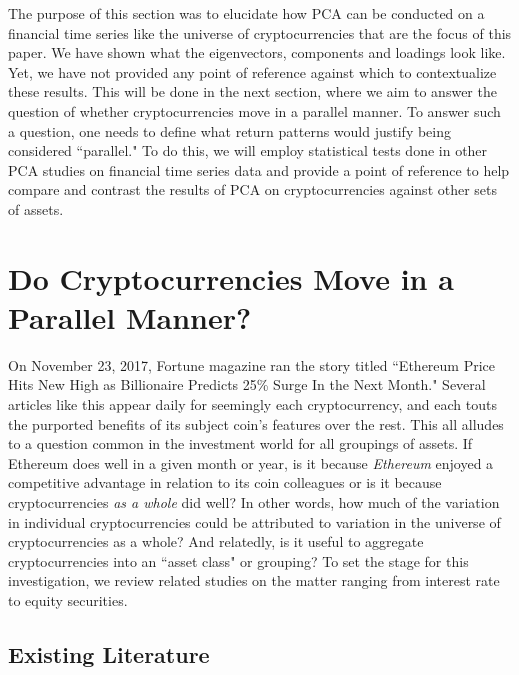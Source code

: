 \documentclass[12pt,twoside]{article}
\begin{document}
The purpose of this section was to elucidate how PCA can be conducted on a financial time series like the universe of cryptocurrencies that are the focus of this paper. We have shown what the eigenvectors, components and loadings look like. Yet, we have not provided any point of reference against which to contextualize these results. This will be done in the next section, where we aim to answer the question of whether cryptocurrencies move in a parallel manner. To answer such a question, one needs to define what return patterns would justify being considered ``parallel." To do this, we will employ statistical tests done in other PCA studies on financial time series data and provide a point of reference to help compare and contrast the results of PCA on cryptocurrencies against other sets of assets.

\section{Do Cryptocurrencies Move in a Parallel Manner?}

On November 23, 2017, Fortune magazine ran the story titled ``Ethereum Price Hits New High as Billionaire Predicts 25\% Surge In the Next Month." Several articles like this appear daily for seemingly each cryptocurrency, and each touts the purported benefits of its subject coin's features over the rest. This all alludes to a question common in the investment world for all groupings of assets. If Ethereum does well in a given month or year, is it because \textit{Ethereum} enjoyed a competitive advantage in relation to its coin colleagues or is it because cryptocurrencies \textit{as a whole} did well? In other words, how much of the variation in individual cryptocurrencies could be attributed to variation in the universe of cryptocurrencies as a whole? And relatedly, is it useful to aggregate cryptocurrencies into an ``asset class" or grouping? To set the stage for this investigation, we review  related studies on the matter ranging from interest rate to equity securities.

\subsection{Existing Literature}
\end{document}
